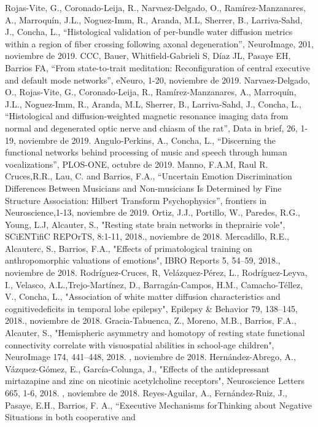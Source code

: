 Rojas-Vite, G., Coronado-Leija, R., Narvaez-Delgado, O., Ramírez-Manzanares, A., Marroquín, J.L., Noguez-Imm, R., Aranda, M.L, Sherrer, B., Larriva-Sahd, 
J., Concha, L., “Histological validation of per-bundle water diffusion metrics within a region of fiber crossing following axonal degeneration”, NeuroImage, 
201,  noviembre de 2019.
CCC, Bauer, Whitfield-Gabrieli S, Díaz JL, Pasaye EH, Barrios FA, “From state-to-trait meditation: Reconfiguration of central executive and default mode 
networks”, eNeuro, 1-20,  noviembre de 2019.
Narvaez-Delgado, O., Rojas-Vite, G., Coronado-Leija, R., Ramírez-Manzanares, A., Marroquín, J.L., Noguez-Imm, R., Aranda, M.L, Sherrer, B., Larriva-Sahd, 
J., Concha, L., “Histological and diffusion-weighted magnetic resonance imaging data from normal and degenerated optic nerve and chiasm of the rat”, Data in 
brief, 26, 1-19,  noviembre de 2019.
Angulo-Perkins, A., Concha, L., “Discerning the functional networks behind processing of music and speech through human vocalizations”, PLOS-ONE,  octubre 
de 2019.
Manno, F.A.M, Raul R. Cruces,R.R., Lau, C. and Barrios, F.A., “Uncertain Emotion Discrimination Differences Between Musicians and Non-musicians Is 
Determined by Fine Structure Association: Hilbert Transform Psychophysics”, frontiers in Neuroscience,1-13,  noviembre de 2019.
Ortiz, J.J., Portillo, W., Paredes, R.G., Young, L.J, Alcauter, S., "Resting state brain networks in theprairie vole", SCiENTifiC REPOrTS, 8:1-11, 2018.,  
noviembre de 2018.
Mercadillo, R.E., Alcauterc, S., Barrios, F.A., "Effects of primatological training on anthropomorphic valuations of emotions", IBRO Reports 5, 54–59, 
2018.,  noviembre de 2018.
Rodríguez-Cruces, R, Velázquez-Pérez, L., Rodríguez-Leyva, I., Velasco, A.L.,Trejo-Martínez, D., Barragán-Campos, H.M., Camacho-Téllez, V., Concha, L., 
"Association of white matter diffusion characteristics and cognitivedeficits in temporal lobe epilepsy", Epilepsy & Behavior 79, 138–145, 2018.,  noviembre 
de 2018.
Gracia-Tabuenca, Z., Moreno, M.B., Barrios, F.A., Alcauter, S., "Hemispheric asymmetry and homotopy of resting state functional connectivity correlate with 
visuospatial abilities in school-age children", NeuroImage 174, 441–448, 2018. ,  noviembre de 2018.
Hernández-Abrego, A., Vázquez-Gómez, E., García-Colunga, J., "Effects of the antidepressant mirtazapine and zinc on nicotinic acetylcholine receptors", 
Neuroscience Letters 665, 1-6, 2018. ,  noviembre de 2018.
Reyes-Aguilar, A., Fernández-Ruiz, J., Pasaye, E.H., Barrios, F. A., “Executive Mechanisms forThinking about Negative Situations in both cooperative and 
